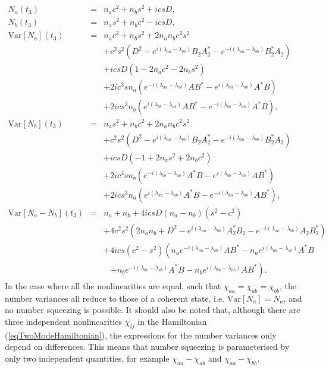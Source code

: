 \documentclass{iopart}
\begin{document}
\begin{eqnarray}
N_a(t_3) &=& n_a c^2 + n_b s^2 + i c s D, \\
%
N_b(t_3) &=& n_a s^2 + n_b c^2 - i c s D, \\
%
{\mathrm{Var}} [ N_a](t_3) &=& n_a c^2 + n_b s^2 + 2 n_a n_b c^2 s^2 \nonumber\\
       && + c^2 s^2 (D^2 - e^{i(\lambda_{aa} - \lambda_{bb})} B_2 A_2^* - e^{-i(\lambda_{aa} - \lambda_{bb})} B_2^* A_2) \nonumber \\
       && + i c s D (1-2 n_a c^2 -2 n_b s^2)  \nonumber\\
       && + 2 i c^3 s n_a (e^{-i(\lambda_{aa} - \lambda_{ab})} A B^* - e^{i(\lambda_{aa} - \lambda_{ab})} A^* B ) \nonumber \\
       && + 2 i c s^3 n_b (e^{i(\lambda_{bb} - \lambda_{ab})} A B^* - e^{-i(\lambda_{bb} - \lambda_{ab})} A^* B ), \\
%
{\mathrm{Var}} [ N_b](t_3) &=&  n_a s^2 + n_b c^2 + 2 n_a n_b c^2 s^2 \nonumber \\
       && + c^2 s^2 (D^2 - e^{i(\lambda_{aa} - \lambda_{bb})} B_2 A_2^* - e^{-i(\lambda_{aa} - \lambda_{bb})} B_2^* A_2 ) \nonumber \\
       && + i c s D (-1+2 n_a s^2 + 2 n_b c^2)  \nonumber \\
       && + 2 i c^3 s n_b (e^{-i(\lambda_{bb} - \lambda_{ab})} A^* B - e^{i(\lambda_{bb} - \lambda_{ab})} A B^* ) \nonumber \\
       && + 2 i c s^3 n_a (e^{i(\lambda_{aa} - \lambda_{ab})} A^* B - e^{-i(\lambda_{aa} - \lambda_{ab})} A B^* ), \\
%
{\mathrm{Var}} [ N_a - N_b](t_3) &=& n_a + n_b + 4 i c s D (n_a - n_b)(s^2 - c^2) \nonumber \\
       && + 4 c^2 s^2 (2 n_a n_b +D^2 - e^{i(\lambda_{aa} - \lambda_{bb})} A_2^* B_2 - e^{-i(\lambda_{aa} - \lambda_{bb})} A_2 B_2^* ) \nonumber \\
       && + 4 i c s (c^2 - s^2) \left( n_a e^{-i(\lambda_{aa} - \lambda_{ab})} A B^* - n_a e^{i(\lambda_{aa} - \lambda_{ab})} A^* B \right. \nonumber \\
       && \,\,\,\,\, \left. + n_b e^{-i(\lambda_{bb} - \lambda_{ab})} A^* B - n_b e^{i(\lambda_{bb} - \lambda_{ab})} A B^* \right). \label{eqNumDiffVariance}
\end{eqnarray}
In the case where all the nonlinearities are equal, such that $\chi_{aa} = \chi_{ab} = \chi_{bb}$, the number variances all reduce to those of a coherent state, i.e. ${\mathrm{Var}}[N_a]=N_a$, and no number squeezing is possible. It should also be noted that, although there are three independent nonlinearities $\chi_{ij}$ in the Hamiltonian (\ref{eqTwoModeHamiltonian}), the expressions for the number variances only depend on differences. This means that number squeezing is parameterised by only two independent quantities, for example $\chi_{aa}-\chi_{ab}$ and $\chi_{aa}-\chi_{bb}$.  
\end{document}
